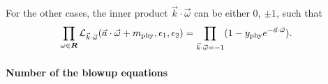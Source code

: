 \documentclass[letterpaper, 11pt]{article}
\def\CL{{\cal L}}
\def\e{\epsilon}
\def\w{\omega}
\begin{document}
For the other cases, the inner product $ \vec{k}\cdot \vec{\w}$ can be either $0$, $\pm 1$, such that 
\begin{align}
  \label{eq:weight-expansion-non-sym}
  \prod_{\w \in \boldsymbol{R}} \CL_{\vec{k}\cdot\vec{\w}}(\vec{a}\cdot \vec{\w} + m_{\text{phy}}, \e_1,\e_2)  &=  \prod_{\vec{k}\cdot \vec{\w} = -1}(1-y_\text{phy} e^{-\vec{a}\cdot \vec{\w}}) .
\end{align}

\paragraph{Number of the blowup equations} 
\end{document}
